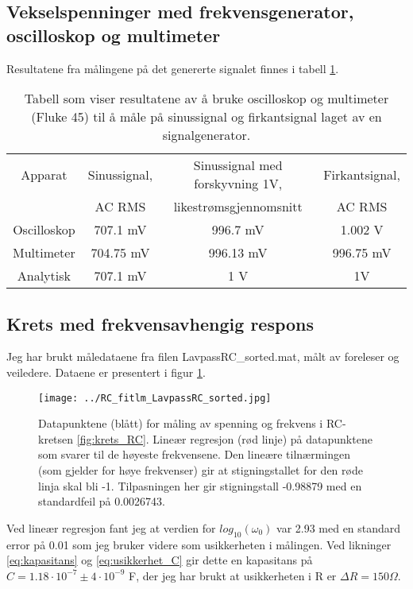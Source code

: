 \documentclass[reprint, english,notitlepage]{revtex4-1}  %
\begin{document}
\subsection{Vekselspenninger med frekvensgenerator, oscilloskop og multimeter}
Resultatene fra målingene på det genererte signalet finnes i tabell \ref{table:AC_RMS}.
\begin{table}[p]
\label{table:AC_RMS}
\caption{Tabell som viser resultatene av å bruke oscilloskop og multimeter (Fluke 45) til å måle på sinussignal og firkantsignal laget av en signalgenerator.}

\begin{adjustbox}{width=\linewidth}
\begin{tabular}{||c || c | c | c||}
\hline
Apparat     & Sinussignal, & Sinussignal med forskyvning 1V, & Firkantsignal, \\
            & AC RMS      & likestrømsgjennomsnitt          & AC RMS        \\ \hline\hline
Oscilloskop & 707.1 mV    & 996.7 mV                        & 1.002 V       \\ \hline
Multimeter  & 704.75 mV   & 996.13 mV                       & 996.75 mV     \\ \hline
Analytisk   & 707.1 mV    & 1 V                             & 1V            \\ \hline
\end{tabular}
\end{adjustbox}
\end{table}

\subsection{Krets med frekvensavhengig respons}
Jeg har brukt måledataene fra filen LavpassRC\_sorted.mat, målt av foreleser og veiledere. Dataene er presentert i figur \ref{fig:LavpassRC}.
\begin{figure}
  \texttt{[image: ../RC\_fitlm\_LavpassRC\_sorted.jpg]}
  \caption{Datapunktene (blått) for måling av spenning og frekvens i RC-kretsen \ref{fig:krets_RC}. Lineær regresjon (rød linje) på datapunktene som svarer til de høyeste frekvensene. Den lineære tilnærmingen (som gjelder for høye frekvenser) gir at stigningstallet for den røde linja skal bli -1. Tilpasningen her gir stigningstall -0.98879 med en standardfeil på 0.0026743.}
  \label{fig:LavpassRC}
\end{figure}
Ved lineær regresjon fant jeg at verdien for $log_{10}(\omega_0)$ var 2.93 med en standard error på 0.01 som jeg bruker videre som usikkerheten i målingen. Ved likninger \ref{eq:kapasitans} og \ref{eq:usikkerhet_C} gir dette en kapasitans på $C = 1.18 \cdot 10^{-7} \pm 4 \cdot 10^{-9}$ F, der jeg har brukt at usikkerheten i R er $\Delta R =  150 \Omega$.
\end{document}
